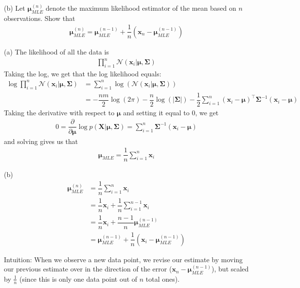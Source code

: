\documentclass[11pt,letterpaper]{article}
\begin{document}
\begin{enumerate}
{{(b) Let $\boldsymbol \mu_{MLE}^{(n)}$ denote the maximum likelihood estimator of the mean based on $n$ observations. Show that
\begin{align}
\boldsymbol \mu_{MLE}^{(n)} = \boldsymbol \mu_{MLE}^{(n-1)} + \dfrac{1}{n}(\mathbf{x}_n - \boldsymbol \mu_{MLE}^{(n-1)})
\end{align}
}}

(a) The likelihood of all the data is 
\begin{align*}
\prod_{i=1}^n \mathcal{N}(\mathbf{x}_i| \boldsymbol{\mu}, \mathbf{\Sigma})
\end{align*}
Taking the log, we get that the log likelihood equals:
\begin{align*}
\log \prod_{i=1}^n \mathcal{N}(\mathbf{x}_i| \boldsymbol{\mu}, \mathbf{\Sigma}) 
&= \sum_{i=1}^n \log(\mathcal{N}(\mathbf{x}_i| \boldsymbol{\mu}, \mathbf{\Sigma})) \\
&= -\dfrac{nm}{2}\log(2\pi) - \dfrac{n}{2}\log(|\mathbf{\Sigma}|) -\dfrac{1}{2}\sum_{i=1}^n(\mathbf{x}_i - \boldsymbol{\mu})^\top\mathbf{\Sigma}^{-1}(\mathbf{x}_i - \boldsymbol{\mu})
\end{align*}
Taking the derivative with respect to $\boldsymbol{\mu}$ and setting it equal to 0, we get \begin{align*}
0 = \dfrac{\partial}{\partial \boldsymbol{\mu}} \log p(\mathbf{X} |\boldsymbol{\mu}, \mathbf{\Sigma}) = \sum_{i=1}^n \mathbf{\Sigma}^{-1}(\mathbf{x}_i - \boldsymbol{\mu})
\end{align*}
and solving gives us that 
\begin{align*}
\boldsymbol{\mu}_{MLE} = \dfrac{1}{n}\sum_{i=1}^n \mathbf{x}_i
\end{align*}

(b) 
\begin{align*}
\boldsymbol \mu_{MLE}^{(n)} &= \dfrac{1}{n}\sum_{i=1}^n \mathbf{x}_i \\
&= \dfrac{1}{n}\mathbf{x}_i + \dfrac{1}{n}\sum_{i=1}^{n-1}\mathbf{x}_i\\
&= \dfrac{1}{n}\mathbf{x}_i + \dfrac{n-1}{n}\boldsymbol{\mu}_{MLE}^{(n-1)}\\
&= \boldsymbol \mu_{MLE}^{(n-1)} + \dfrac{1}{n}(\mathbf{x}_i - \boldsymbol \mu_{MLE}^{(n-1)})
\end{align*}

Intuition: When we observe a new data point, we revise our estimate by moving our previous estimate over in the direction of the error ($\mathbf{x}_n - \mathbf{\mu}_{MLE}^{(n-1)}$), but scaled by $\frac{1}{n}$ (since this is only one data point out of $n$ total ones).



\end{enumerate}
\end{document}
